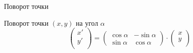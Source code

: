 \documentclass[10pt]{beamer}
\begin{document}
\begin{frame}{Поворот точки}
{    	    \begin{block}{Поворот точки $(x,y)$ на угол $\alpha$}
    	    	$$
    	    	\begin{pmatrix}
    	    		x' \\
    	    		y' \\
    	    	\end{pmatrix}
    	    	=
    	    	\begin{pmatrix}
    	    		\cos\alpha & -\sin\alpha \\
    	    		\sin\alpha & \cos\alpha
    	    	\end{pmatrix}
    	    	\cdot
    	        \begin{pmatrix}
    	    		x \\
    	    		y \\
    	    	\end{pmatrix}
    	    	$$
    	    \end{block}
    		
    		

    	}
    	
    \end{frame}
    
\end{document}
